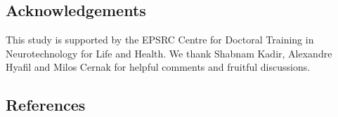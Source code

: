 \documentclass[a0,portrait]{a0poster}
\newenvironment{nitemize}{%
  \begin{itemize}[topsep=6pt,itemsep=2pt,parsep=0pt]%
}{%
  \end{itemize}%
}
\begin{document}
\begin{multicols*}{2}




\small
\subsection*{Acknowledgements}
\begin{flushleft}
This study is supported by the EPSRC Centre for Doctoral Training in Neurotechnology for Life and Health. We thank Shabnam Kadir, Alexandre Hyafil and Milos Cernak for helpful comments and fruitful discussions. 
\end{flushleft}

\subsection*{References}
\begingroup
\footnotesize
\renewcommand{\section}[2]{}%


\endgroup

\end{multicols*}
\end{document}
